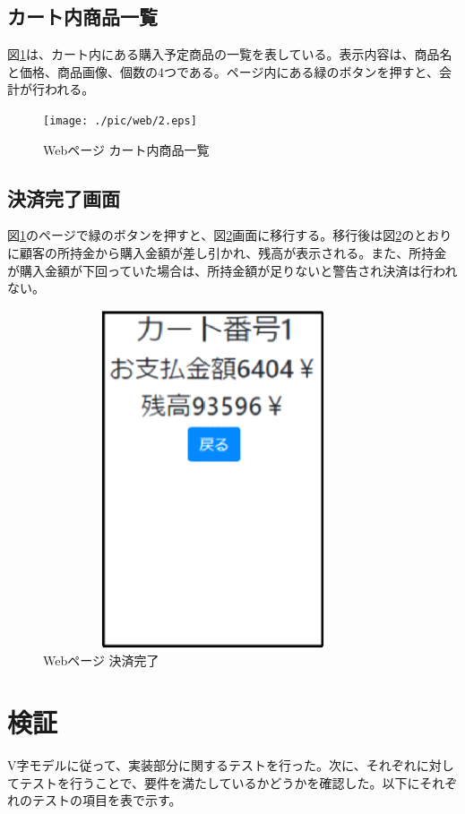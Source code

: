 \subsection*{カート内商品一覧}
図\ref{web_cart_items}は、カート内にある購入予定商品の一覧を表している。表示内容は、商品名と価格、商品画像、個数の4つである。ページ内にある緑のボタンを押すと、会計が行われる。
\begin{figure}[htbp]
\centering
\texttt{[image: ./pic/web/2.eps]}
\caption{Webページ カート内商品一覧}
\label{web_cart_items}
\end{figure}

\subsection*{決済完了画面}
図\ref{web_cart_items}のページで緑のボタンを押すと、図\ref{web_checksum}画面に移行する。移行後は図\ref{web_checksum}のとおりに顧客の所持金から購入金額が差し引かれ、残高が表示される。また、所持金が購入金額が下回っていた場合は、所持金額が足りないと警告され決済は行われない。
\begin{figure}[htbp]
\centering
\includegraphics[width=10cm,height=10cm]{./pic/web/3.eps}
\caption{Webページ 決済完了}
\label{web_checksum}
\end{figure}

\newpage

\section{検証}
V字モデルに従って、実装部分に関するテストを行った。次に、それぞれに対してテストを行うことで、要件を満たしているかどうかを確認した。以下にそれぞれのテストの項目を表で示す。

